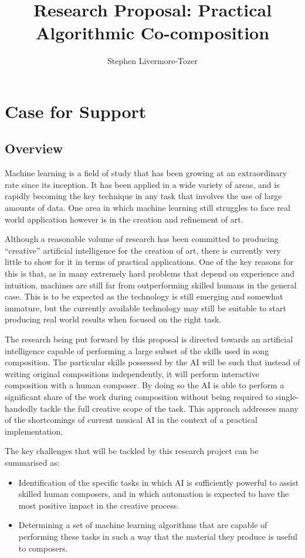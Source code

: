 \documentclass[11pt]{article}
\author{Stephen Livermore-Tozer}
\title{Research Proposal: Practical Algorithmic Co-composition}
\begin{document}
	\maketitle
	
	\section{Case for Support}
	
	\subsection{Overview}
	
	Machine learning is a field of study that has been growing at an extraordinary rate since its inception. It has been applied in a wide variety of areas, and is rapidly becoming the key technique in any task that involves the use of large amounts of data. One area in which machine learning still struggles to face real world application however is in the creation and refinement of art.
	
	Although a reasonable volume of research has been committed to producing ``creative'' artificial intelligence for the creation of art, there is currently very little to show for it in terms of practical applications. One of the key reasons for this is that, as in many extremely hard problems that depend on experience and intuition, machines are still far from outperforming skilled humans in the general case. This is to be expected as the technology is still emerging and somewhat immature, but the currently available technology may still be suitable to start producing real world results when focused on the right task.
	
	The research being put forward by this proposal is directed towards an artificial intelligence capable of performing a large subset of the skills used in song composition. The particular skills possessed by the AI will be such that instead of writing original compositions independently, it will perform interactive composition with a human composer. By doing so the AI is able to perform a significant share of the work during composition without being required to single-handedly tackle the full creative scope of the task. This approach addresses many of the shortcomings of current musical AI in the context of a practical implementation. 
	
	The key challenges that will be tackled by this research project can be summarised as:
	
	\begin{itemize}
		\item Identification of the specific tasks in which AI is sufficiently powerful to assist skilled human composers, and in which automation is expected to have the most positive impact in the creative process.
		\item Determining a set of machine learning algorithms that are capable of performing these tasks in such a way that the material they produce is useful to composers.
	\end{itemize}
	
\end{document}
